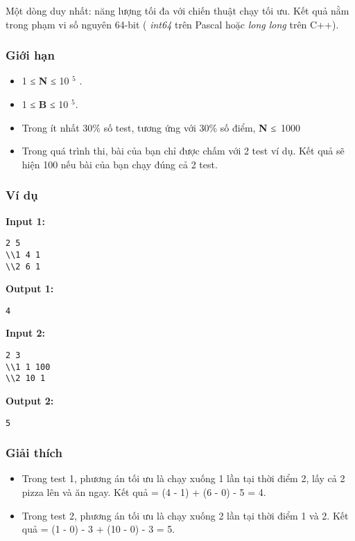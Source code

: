    Một dòng duy nhất: năng lượng tối đa với chiến thuật chạy tối ưu. Kết quả nằm trong phạm vi số nguyên 64-bit (   \emph{    int64   }   trên Pascal hoặc   \emph{    long long   }   trên C++).  

\subsubsection{   Giới hạn  }
\begin{itemize}
	\item     1         ≤     \textbf{      N     }      ≤ 10      $^       5      $      .     
	\item     1 ≤    \textbf{     B    }    ≤ 10    $^     5.    $
	\item     Trong ít nhất 30\% số test, tương ứng với 30\% số điểm,    \textbf{     N    }    ≤ 1000   
	\item     Trong quá trình thi, bài của bạn chỉ được chấm với 2 test ví dụ. Kết quả sẽ hiện 100 nếu bài của bạn chạy đúng cả 2 test.   
\end{itemize}

\subsubsection{   Ví dụ  }

\textbf{    Input 1:   }
\begin{verbatim}
2 5
\\1 4 1
\\2 6 1\end{verbatim}

\textbf{    Output 1:   }
\begin{verbatim}
4\end{verbatim}

\textbf{    Input 2:   }
\begin{verbatim}
2 3
\\1 1 100
\\2 10 1\end{verbatim}

\textbf{    Output 2:   }
\begin{verbatim}
5\end{verbatim}

\subsubsection{   Giải thích  }
\begin{itemize}
	\item     Trong test 1, phương án tối ưu là chạy xuống 1 lần tại thời điểm 2, lấy cả 2 pizza lên và ăn ngay. Kết quả = (4 - 1) + (6 - 0) - 5 = 4.   
	\item     Trong test 2, phương án tối ưu là chạy xuống 2 lần tại thời điểm 1 và 2. Kết quả = (1 - 0) - 3 + (10 - 0) - 3 = 5.   
\end{itemize}